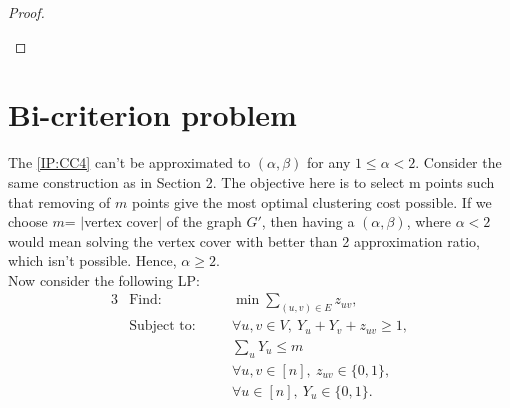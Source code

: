 \begin{proof}
\begin{enumerate}
\end{enumerate}
\end{proof}

\section{Bi-criterion problem}
The \ref{IP:CC4} can't be approximated to $(\alpha, \beta)$ for any $1\leq \alpha<2$. Consider the same construction as in Section 2. The objective here is to select m points such that removing of $m$ points give the most optimal clustering cost possible. If we choose $m$= $|$vertex cover$|$ of the graph $G'$, then having a $(\alpha, \beta)$, where $\alpha<2$ would mean solving the vertex cover with better than 2 approximation ratio, which isn't possible. Hence, $\alpha \geq 2$.\\

Now consider the following LP:
\begin{alignat}{3} \label{IP:CC5}
		&\text{Find: } && \min \sum_{(u,v) \in E} z_{uv}, \nonumber\\
		&\text{Subject to:} \quad && \forall u,v \in V,\ Y_u + Y_v + z_{uv} \ge 1, \nonumber\\
		& && \sum_{u} Y_u \le m \nonumber \\
		& && \forall u,v \in [n],\ z_{uv} \in \{ 0,1 \},\nonumber\\
		& && \forall u \in [n],\ Y_u \in \{ 0,1 \}. \tag{IP4}
\end{alignat}

